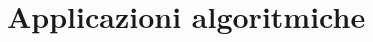 \documentclass[\main/main.tex]{subfiles}
\begin{document}
\chapter{Applicazioni algoritmiche}
\end{document}
